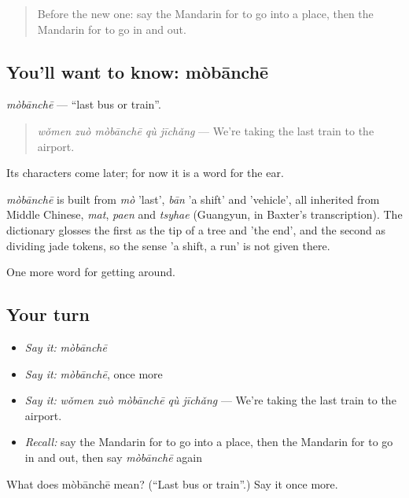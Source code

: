 \label{lesson:ZH-C405-mobanche}



\begin{quote}
Before the new one: say the Mandarin for to go into a place, then the Mandarin for to go in and out.
\end{quote}

\subsection*{You'll want to know: mòbānchē}
\emph{mòbānchē} — \textquotedblleft{}last bus or train\textquotedblright{}.

\begin{quote}
\emph{wǒmen zuò mòbānchē qù jīchǎng} — We're taking the last train to the airport.
\end{quote}

Its characters come later; for now it is a word for the ear.

\begin{cousinweb}
\emph{mòbānchē} is built from \emph{mò} 'last', \emph{bān} 'a shift' and  'vehicle', all inherited from Middle Chinese, \emph{mat}, \emph{paen} and \emph{tsyhae} (Guangyun, in Baxter's transcription). The dictionary glosses the first as the tip of a tree and 'the end', and the second as dividing jade tokens, so the sense 'a shift, a run' is not given there.
\end{cousinweb}

\begin{grammarlens}[title={What you've built}]
One more word for getting around.
\end{grammarlens}

\subsection*{Your turn}
\begin{itemize}
\raggedright
  \item \emph{Say it:} \emph{mòbānchē}
  \item \emph{Say it:} \emph{mòbānchē}, once more
  \item \emph{Say it:} \emph{wǒmen zuò mòbānchē qù jīchǎng} — We're taking the last train to the airport.
  \item \emph{Recall:} say the Mandarin for to go into a place, then the Mandarin for to go in and out, then say \emph{mòbānchē} again
\end{itemize}

\begin{tcolorbox}[breakable,colback=teal!4,colframe=teal!35!black,title={Before you move on}]
What does mòbānchē mean? (\textquotedblleft{}Last bus or train\textquotedblright{}.) Say it once more.
\end{tcolorbox}
